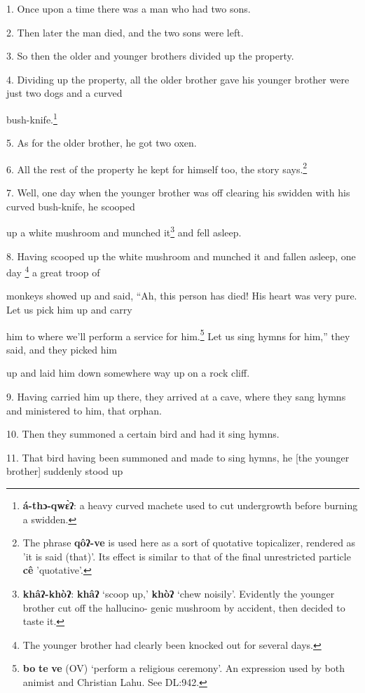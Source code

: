 \setcounter{footnote}{0}

1. Once upon a time there was a man who had two sons.

2. Then later the man died, and the two sons were left.

3. So then the older and younger brothers divided up the property.

4. Dividing up the property, all the older brother gave his younger brother were
just two dogs and a curved

bush-knife.\footnote{\textbf{á-thɔ-qwɛ̀ʔ}: a heavy curved machete used to cut undergrowth before burning a swidden.}

5. As for the older brother, he got two oxen.

6. All the rest of the property he kept for himself too, the story says.\footnote{The phrase \textbf{qôʔ-ve} is used here as a sort of quotative topicalizer, rendered as 'it is said (that)'. Its effect is similar to that of the final unrestricted particle \textbf{cê} 'quotative'.}

7. Well, one day when the younger brother was off clearing his swidden with his
curved bush-knife, he scooped

up a white mushroom and munched it\footnote{\textbf{khâʔ-khòʔ}: \textbf{khâʔ} `scoop up,' \textbf{khòʔ} `chew noisily'. Evidently the younger brother cut off the hallucino- genic mushroom by accident, then decided to taste it.} and fell asleep.

8. Having scooped up the white mushroom and munched it and fallen asleep, one day
\footnote{The younger brother had clearly been knocked out for several days.} a great troop of

monkeys showed up and said, ``Ah, this person has died! His heart was very pure.
Let us pick him up and carry

him to where we'll perform a service for him.\footnote{\textbf{bo} \textbf{te} \textbf{ve} (OV) `perform a religious ceremony'. An expression used by both animist and Christian Lahu. See DL:942.} Let us sing hymns for him,''
they said, and they picked him

up and laid him down somewhere way up on a rock cliff.

9. Having carried him up there, they arrived at a cave, where they sang hymns and
ministered to him, that orphan.

10. Then they summoned a certain bird and had it sing hymns.

11. That bird having been summoned and made to sing hymns, he [the younger brother]
suddenly stood up

